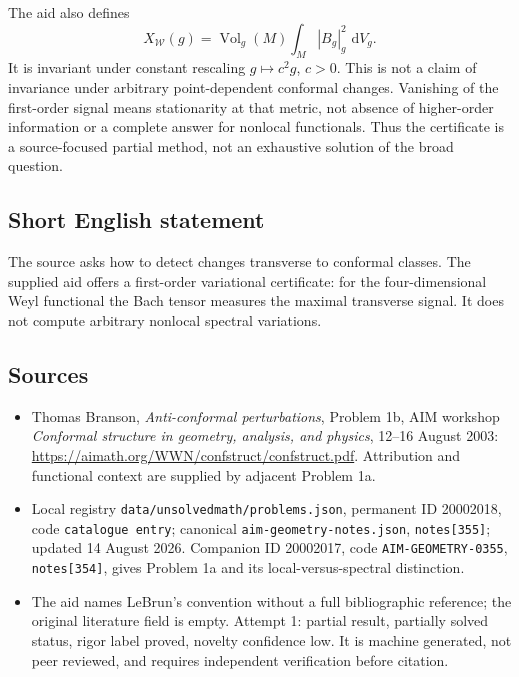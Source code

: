 \documentclass[11pt]{article}
\newcommand{\dd}{\,\mathrm{d}}
\begin{document}
The aid also defines
\[
X_{\mathcal W}(g)=\operatorname{Vol}_g(M)\int_M|B_g|_g^2\,\dd V_g.
\]
It is invariant under constant rescaling \(g\mapsto c^2g\), \(c>0\). This is not a claim of invariance under arbitrary point-dependent conformal changes. Vanishing of the first-order signal means stationarity at that metric, not absence of higher-order information or a complete answer for nonlocal functionals. Thus the certificate is a source-focused partial method, not an exhaustive solution of the broad question.
\subsection{Short English statement}
The source asks how to detect changes transverse to conformal classes. The supplied aid offers a first-order variational certificate: for the four-dimensional Weyl functional the Bach tensor measures the maximal transverse signal. It does not compute arbitrary nonlocal spectral variations.
\subsection{Sources}
\begin{itemize}
\item Thomas Branson, \emph{Anti-conformal perturbations}, Problem 1b, AIM workshop \emph{Conformal structure in geometry, analysis, and physics}, 12--16 August 2003: \url{https://aimath.org/WWN/confstruct/confstruct.pdf}. Attribution and functional context are supplied by adjacent Problem 1a.
\item Local registry \texttt{data/unsolvedmath/problems.json}, permanent ID 20002018, code \texttt{catalogue entry}; canonical \texttt{aim-geometry-notes.json}, \texttt{notes[355]}; updated 14 August 2026. Companion ID 20002017, code \texttt{AIM-GEOMETRY-0355}, \texttt{notes[354]}, gives Problem 1a and its local-versus-spectral distinction.
\item The aid names LeBrun's convention without a full bibliographic reference; the original literature field is empty. Attempt 1: partial result, partially solved status, rigor label proved, novelty confidence low. It is machine generated, not peer reviewed, and requires independent verification before citation.
\end{itemize}
\end{document}
